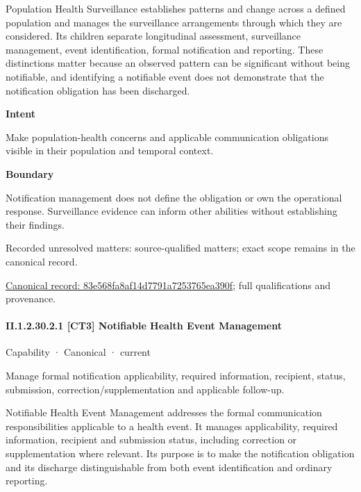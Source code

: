 Population Health Surveillance establishes patterns and change across a defined population and manages the surveillance arrangements through which they are considered. Its children separate longitudinal assessment, surveillance management, event identification, formal notification and reporting. These distinctions matter because an observed pattern can be significant without being notifiable, and identifying a notifiable event does not demonstrate that the notification obligation has been discharged.



\textbf{Intent}



Make population-health concerns and applicable communication obligations visible in their population and temporal context.



\textbf{Boundary}



Notification management does not define the obligation or own the operational response. Surveillance evidence can inform other abilities without establishing their findings.


{\small Recorded unresolved matters: source-qualified matters; exact scope remains in the canonical record.}\par
{\footnotesize \href{../../../../continuum/strategy/capability/83e568fa8af14d7791a7253765ea390f.md}{Canonical record: 83e568fa8af14d7791a7253765ea390f}; full qualifications and provenance.}\par
\paragraph*{II.1.2.30.2.1 [CT3] Notifiable Health Event Management}
\label{navigation:II.1.2.30.2.1}

\label{element:e605436254ed4dad819f452448e054a1}
{\small Capability · Canonical · current}\par

Manage formal notification applicability, required information, recipient, status, submission, correction/supplementation and applicable follow-up.



Notifiable Health Event Management addresses the formal communication responsibilities applicable to a health event. It manages applicability, required information, recipient and submission status, including correction or supplementation where relevant. Its purpose is to make the notification obligation and its discharge distinguishable from both event identification and ordinary reporting.



